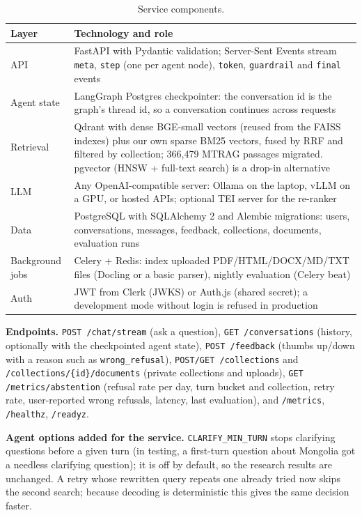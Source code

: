 \documentclass[11pt,a4paper]{report}
\begin{document}
\begin{table}[H]
\centering\small
\begin{tabularx}{\textwidth}{@{}lY@{}}
\toprule
Layer & Technology and role \\
\midrule
API & FastAPI with Pydantic validation; Server-Sent Events stream \texttt{meta}, \texttt{step} (one per agent node), \texttt{token}, \texttt{guardrail} and \texttt{final} events \\
Agent state & LangGraph Postgres checkpointer: the conversation id is the graph's thread id, so a conversation continues across requests \\
Retrieval & Qdrant with dense BGE-small vectors (reused from the FAISS indexes) plus our own sparse BM25 vectors, fused by RRF and filtered by collection; 366{,}479 MTRAG passages migrated. pgvector (HNSW + full-text search) is a drop-in alternative \\
LLM & Any OpenAI-compatible server: Ollama on the laptop, vLLM on a GPU, or hosted APIs; optional TEI server for the re-ranker \\
Data & PostgreSQL with SQLAlchemy 2 and Alembic migrations: users, conversations, messages, feedback, collections, documents, evaluation runs \\
Background jobs & Celery + Redis: index uploaded PDF/HTML/DOCX/MD/TXT files (Docling or a basic parser), nightly evaluation (Celery beat) \\
Auth & JWT from Clerk (JWKS) or Auth.js (shared secret); a development mode without login is refused in production \\
\bottomrule
\end{tabularx}
\caption{Service components.}
\label{tab:service}
\end{table}

\textbf{Endpoints.} \texttt{POST /chat/stream} (ask a question), \texttt{GET /conversations} (history, optionally with the checkpointed agent state), \texttt{POST /feedback} (thumbs up/down with a reason such as \texttt{wrong\_refusal}), \texttt{POST/GET /collections} and \texttt{/collections/\{id\}/documents} (private collections and uploads), \texttt{GET /metrics/abstention} (refusal rate per day, turn bucket and collection, retry rate, user-reported wrong refusals, latency, last evaluation), and \texttt{/metrics}, \texttt{/healthz}, \texttt{/readyz}.

\textbf{Agent options added for the service.} \texttt{CLARIFY\_MIN\_TURN} stops clarifying questions before a given turn (in testing, a first-turn question about Mongolia got a needless clarifying question); it is off by default, so the research results are unchanged. A retry whose rewritten query repeats one already tried now skips the second search; because decoding is deterministic this gives the same decision faster.
\end{document}
